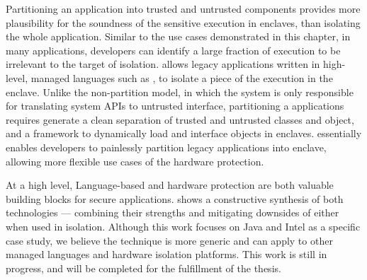 \label{sec:civet:summary}

Partitioning an application into trusted and untrusted components
provides more plausibility for the soundness of the sensitive execution in enclaves,
than isolating the whole application.
Similar to the use cases demonstrated in this chapter,
in many applications,
developers can identify a large fraction of execution to be irrelevant to
the target of isolation.
\sysname{} allows legacy applications written in high-level,
managed languages such as \java{},
to isolate a piece of the execution in the \sgx{} enclave.
Unlike the non-partition model,
in which the system is only responsible for translating system APIs to untrusted interface,
partitioning a \java{} applications requires generate a clean separation
of trusted and untrusted classes and object,
and a framework to dynamically load and interface objects in enclaves.
\sysname{} essentially enables developers to painlessly partition legacy \java{} applications into enclave,
allowing more flexible use cases of the hardware protection.

At a high level,
Language-based and hardware protection are both valuable
building blocks for secure applications.
\sysname{} shows a constructive synthesis of both technologies
--- combining their strengths
and mitigating downsides of either when used in isolation.
Although this work focuses on Java and Intel \sgx{} as a specific case study,
we believe the technique is more generic
and can apply to
other managed languages and hardware isolation platforms.
This work is still in progress, and will be completed for the fulfillment of the thesis.



